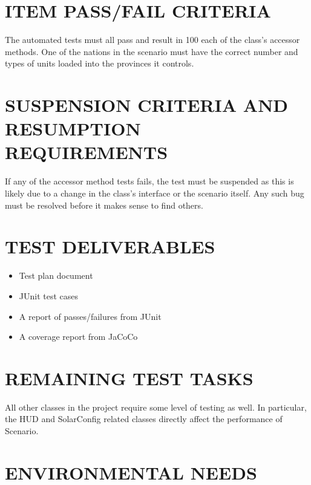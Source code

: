 \section[ITEM PASS/FAIL CRITERIA]{\bfseries\color{black}
	 ITEM PASS/FAIL CRITERIA}

{\color{black}
The automated tests must all pass and result in 100%
each of the class's accessor methods. One of the nations in the scenario must 
have the correct number and types of units loaded into the provinces it controls.}

\section[SUSPENSION CRITERIA]{\bfseries\color{black}
	 SUSPENSION CRITERIA AND RESUMPTION REQUIREMENTS}
{\color{black}
If any of the accessor method tests fails, the test must be suspended as 
this is likely due to a change in the class's interface or the scenario 
itself. Any such bug must be resolved before it makes sense to find others.}

\section[TEST DELIVERABLES]{\bfseries\color{black} TEST DELIVERABLES}

{\color{black}
\begin{itemize}
\item Test plan document
\item JUnit test cases
\item A report of passes/failures from JUnit
\item A coverage report from JaCoCo
\end{itemize}}

\section[REMAINING TEST TASKS]{\bfseries\color{black} REMAINING TEST TASKS}

{\color{black}
All other classes in the project require some level of testing as well. 
In particular, the HUD and SolarConfig related classes directly affect 
the performance of Scenario.}

\section[ENVIRONMENTAL NEEDS]{\bfseries\color{black} ENVIRONMENTAL NEEDS}

